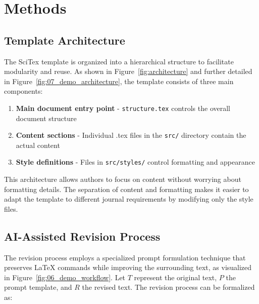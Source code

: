 
\section{Methods}
\label{sec:methods}


\subsection{Template Architecture}
\label{subsec:architecture}

The SciTex template is organized into a hierarchical structure to facilitate modularity and reuse. As shown in Figure~\ref{fig:architecture} and further detailed in Figure~\ref{fig:07_demo_architecture}, the template consists of three main components:

\begin{enumerate}
    \item \textbf{Main document entry point} - \verb|structure.tex| controls the overall document structure
    \item \textbf{Content sections} - Individual .tex files in the \verb|src/| directory contain the actual content
    \item \textbf{Style definitions} - Files in \verb|src/styles/| control formatting and appearance
\end{enumerate}

This architecture allows authors to focus on content without worrying about formatting details. The separation of content and formatting makes it easier to adapt the template to different journal requirements by modifying only the style files.


\subsection{AI-Assisted Revision Process}
\label{subsec:ai-revision}

The revision process employs a specialized prompt formulation technique that preserves LaTeX commands while improving the surrounding text, as visualized in Figure~\ref{fig:06_demo_workflow}. Let $T$ represent the original text, $P$ the prompt template, and $R$ the revised text. The revision process can be formalized as:

